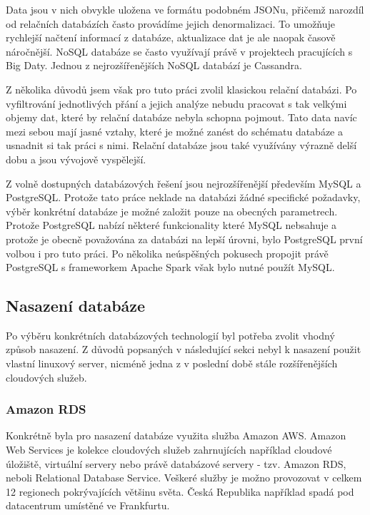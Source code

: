 \documentclass[thesis=B,czech]{FITthesis}[2012/06/26]
\begin{document}
	Data jsou v nich obvykle uložena ve formátu podobném JSONu, přičemž narozdíl od relačních databázích často provádíme jejich denormalizaci. To umožňuje rychlejší načtení informací z databáze, aktualizace dat je ale naopak časově náročnější. NoSQL databáze se často využívají právě v projektech pracujících s Big Daty. Jednou z nejrozšířenějších NoSQL databází je Cassandra. 
	
	Z několika důvodů jsem však pro tuto práci zvolil klasickou relační databázi. Po vyfiltrování jednotlivých přání a jejich analýze nebudu pracovat s tak velkými objemy dat, které by relační databáze nebyla schopna pojmout. Tato data navíc mezi sebou mají jasné vztahy, které je možné zanést do schématu databáze a usnadnit si tak práci s nimi. Relační databáze jsou také využívány výrazně delší dobu a jsou vývojově vyspělejší. 
	
	Z volně dostupných databázových řešení jsou nejrozšířenější především MySQL a PostgreSQL. Protože tato práce neklade na databázi žádné specifické požadavky, výběr konkrétní databáze je možné založit pouze na obecných parametrech. Protože PostgreSQL nabízí některé funkcionality které MySQL nebsahuje a protože je obecně považována za databázi na lepší úrovni\cite{aaaaaaaa}, bylo PostgreSQL první volbou i pro tuto práci. Po několika neúspěšných pokusech propojit právě PostgreSQL s frameworkem Apache Spark však bylo nutné použít MySQL. 
	
\subsection{Nasazení databáze}
	Po výběru konkrétních databázových technologií byl potřeba zvolit vhodný způsob nasazení. Z důvodů popsaných v následující sekci nebyl k nasazení použit vlastní linuxový server, nicméně jedna z v poslední době stále rozšířenějších cloudových služeb. 
	
\subsubsection{Amazon RDS}
	Konkrétně byla pro nasazení databáze využita služba Amazon AWS\cite{gghjjkk}. Amazon Web Services je kolekce cloudových služeb zahrnujících například cloudové úložiště, virtuální servery nebo právě databázové servery - tzv. Amazon RDS, neboli Relational Database Service. Veškeré služby je možno provozovat v celkem 12 regionech pokrývajících většinu světa. Česká Republika například spadá pod datacentrum umístěné ve Frankfurtu. 
	
\end{document}

